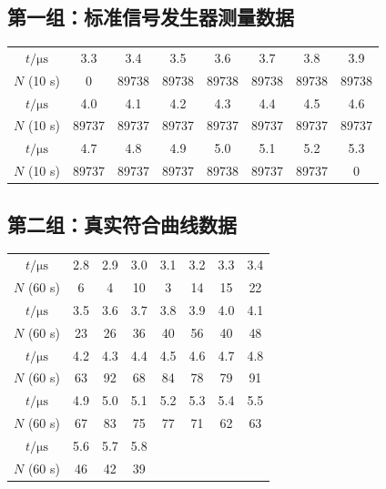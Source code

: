 \documentclass[12pt,a4paper]{article}
\begin{document}
\subsection{第一组：标准信号发生器测量数据}

\begin{center}
\begin{tabular}{cccccccc}
\toprule
$t/\si{\micro\second}$ & 3.3 & 3.4 & 3.5 & 3.6 & 3.7 & 3.8 & 3.9 \\
$N$ (10 s) & 0 & 89738 & 89738 & 89738 & 89738 & 89738 & 89738 \\
\midrule
$t/\si{\micro\second}$ & 4.0 & 4.1 & 4.2 & 4.3 & 4.4 & 4.5 & 4.6 \\
$N$ (10 s) & 89737 & 89737 & 89737 & 89737 & 89737 & 89737 & 89737 \\
\midrule
$t/\si{\micro\second}$ & 4.7 & 4.8 & 4.9 & 5.0 & 5.1 & 5.2 & 5.3 \\
$N$ (10 s) & 89737 & 89737 & 89737 & 89738 & 89737 & 89737 & 0 \\
\bottomrule
\end{tabular}
\end{center}

\subsection{第二组：真实符合曲线数据}
\begin{center}
\begin{tabular}{cccccccc}
\toprule
$t/\si{\micro\second}$ & 2.8 & 2.9 & 3.0 & 3.1 & 3.2 & 3.3 & 3.4 \\
$N$ (60 s) & 6 & 4 & 10 & 3 & 14 & 15 & 22 \\
\midrule
$t/\si{\micro\second}$ & 3.5 & 3.6 & 3.7 & 3.8 & 3.9 & 4.0 & 4.1 \\
$N$ (60 s) & 23 & 26 & 36 & 40 & 56 & 40 & 48 \\
\midrule
$t/\si{\micro\second}$ & 4.2 & 4.3 & 4.4 & 4.5 & 4.6 & 4.7 & 4.8 \\
$N$ (60 s) & 63 & 92 & 68 & 84 & 78 & 79 & 91 \\
\midrule
$t/\si{\micro\second}$ & 4.9 & 5.0 & 5.1 & 5.2 & 5.3 & 5.4 & 5.5 \\
$N$ (60 s) & 67 & 83 & 75 & 77 & 71 & 62 & 63 \\
\midrule
$t/\si{\micro\second}$ & 5.6 & 5.7 & 5.8 &  &  &  &  \\
$N$ (60 s) & 46 & 42 & 39 &  &  &  &  \\
\bottomrule
\end{tabular}
\end{center}
\end{document}
